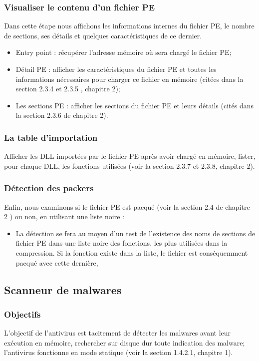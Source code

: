 \subsubsection{Visualiser le contenu d'un fichier PE}
Dans cette étape nous affichons les informations internes du fichier PE, le nombre de sections, ses détails et quelques caractéristiques de ce dernier.
\begin{itemize}
\item Entry point : récupérer l'adresse mémoire où  sera chargé le fichier PE;
\item Détail PE   : afficher les caractéristiques du fichier PE et toutes les informations nécessaires pour charger ce  fichier en mémoire (citées dans la section 2.3.4 et  2.3.5 , chapitre 2);
\item Les sections PE : afficher les sections du fichier PE et leurs détails (cités dans la section 2.3.6 de chapitre 2).
\end{itemize}
\subsubsection{La table d'importation}
Afficher les DLL importées par le fichier PE après avoir chargé en mémoire, lister, pour chaque DLL, les fonctions utilisées (voir la section  2.3.7 et 2.3.8, chapitre 2).
\subsubsection{Détection des packers}
Enfin, nous examinons si le fichier PE est pacqué (voir la section 2.4 de chapitre 2 )  ou non, en utilisant une liste noire :
\begin{itemize}
\item La détection se fera au moyen d'un test de l'existence des noms de sections de fichier PE dans une liste noire des fonctions, les plus utilisées dans la compression. Si la fonction existe dans la liste, le fichier est conséquemment pacqué avec cette dernière, \end{itemize}
\subsection{Scanneur de malwares }
\subsubsection{Objectifs}
L'objectif de l'antivirus est tacitement de détecter les malwares avant leur exécution en mémoire, rechercher sur disque dur toute indication des malware; l'antivirus fonctionne en mode statique (voir la section 1.4.2.1, chapitre 1).
